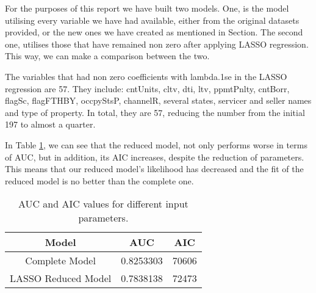 For the purposes of this report we have built two models. One, is the model utilising every variable we have had available, either from the original datasets provided, or the new ones we have created as mentioned in Section. The second one, utilises those that have remained non zero after applying LASSO regression. This way, we can make a comparison between the two.

The variables that had non zero coefficients with lambda.1se in the LASSO regression are 57. They include: cntUnits, cltv, dti, ltv, ppmtPnlty, cntBorr, flagSc, flagFTHBY, occpyStsP, channelR, several states, servicer and seller names and type of property. In total, they are 57, reducing the number from the initial 197 to almost a quarter. 


    
In Table \ref{ModelAICandAUC}, we can see that the reduced model, not only performs worse in terms of AUC, but in addition, its AIC increases, despite the reduction of parameters. This means that our reduced model's likelihood has decreased and the fit of the reduced model is no better than the complete one.
    
    \begin{table}[H]
        \centering
            \begin{tabular}{c|c|c}
            Model & AUC & AIC \\\hline
            Complete Model & 0.8253303 & 70606\\
            LASSO Reduced Model &  0.7838138 & 72473\\
            
		    \end{tabular}
            \caption{AUC and AIC values for different input parameters.}
	        \label{ModelAICandAUC}
    \end{table}
